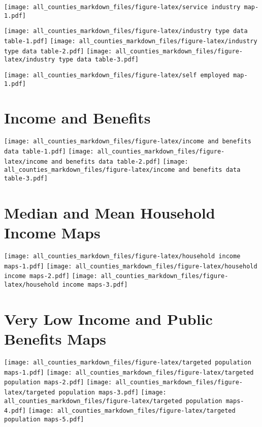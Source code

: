 \documentclass[
]{article}
\begin{document}
\texttt{[image: all\_counties\_markdown\_files/figure-latex/service industry map-1.pdf]}

\texttt{[image: all\_counties\_markdown\_files/figure-latex/industry type data table-1.pdf]}
\texttt{[image: all\_counties\_markdown\_files/figure-latex/industry type data table-2.pdf]}
\texttt{[image: all\_counties\_markdown\_files/figure-latex/industry type data table-3.pdf]}

\texttt{[image: all\_counties\_markdown\_files/figure-latex/self employed map-1.pdf]}

\hypertarget{income-and-benefits}{%
\section{Income and Benefits}\label{income-and-benefits}}

\texttt{[image: all\_counties\_markdown\_files/figure-latex/income and benefits data table-1.pdf]}
\texttt{[image: all\_counties\_markdown\_files/figure-latex/income and benefits data table-2.pdf]}
\texttt{[image: all\_counties\_markdown\_files/figure-latex/income and benefits data table-3.pdf]}

\hypertarget{median-and-mean-household-income-maps}{%
\section{Median and Mean Household Income
Maps}\label{median-and-mean-household-income-maps}}

\texttt{[image: all\_counties\_markdown\_files/figure-latex/household income maps-1.pdf]}
\texttt{[image: all\_counties\_markdown\_files/figure-latex/household income maps-2.pdf]}
\texttt{[image: all\_counties\_markdown\_files/figure-latex/household income maps-3.pdf]}

\hypertarget{very-low-income-and-public-benefits-maps}{%
\section{Very Low Income and Public Benefits
Maps}\label{very-low-income-and-public-benefits-maps}}

\texttt{[image: all\_counties\_markdown\_files/figure-latex/targeted population maps-1.pdf]}
\texttt{[image: all\_counties\_markdown\_files/figure-latex/targeted population maps-2.pdf]}
\texttt{[image: all\_counties\_markdown\_files/figure-latex/targeted population maps-3.pdf]}
\texttt{[image: all\_counties\_markdown\_files/figure-latex/targeted population maps-4.pdf]}
\texttt{[image: all\_counties\_markdown\_files/figure-latex/targeted population maps-5.pdf]}
\end{document}
